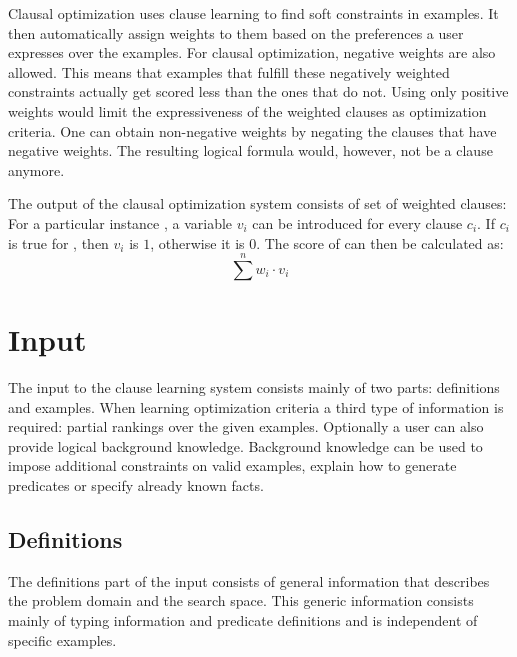 Clausal optimization uses clause learning to find soft constraints in examples.
It then automatically assign weights to them based on the preferences a user expresses over the examples.
For clausal optimization, negative weights are also allowed.
This means that examples that fulfill these negatively weighted constraints actually get scored less than the ones that do not.
Using only positive weights would limit the expressiveness of the weighted clauses as optimization criteria.
One can obtain non-negative weights by negating the clauses that have negative weights.
The resulting logical formula would, however, not be a clause anymore.

The output of the clausal optimization system consists of set of weighted clauses: 
For a particular instance , a variable $v_i$ can be introduced for every clause $c_i$.
If $c_i$ is true for , then $v_i$ is $1$, otherwise it is $0$. The score of  can then be calculated as:
\begin{equation}
\label{eq:weights_sum}
\sum\limits^n w_i \cdot v_i
\end{equation}

\section{Input}
The input to the clause learning system consists mainly of two parts: definitions and examples.
When learning optimization criteria a third type of information is required: partial rankings over the given examples.
Optionally a user can also provide logical background knowledge.
Background knowledge can be used to impose additional constraints on valid examples, explain how to generate predicates or specify already known facts.

\subsection{Definitions}
The definitions part of the input consists of general information that describes the problem domain and the search space.
This generic information consists mainly of typing information and predicate definitions and is independent of specific examples.

